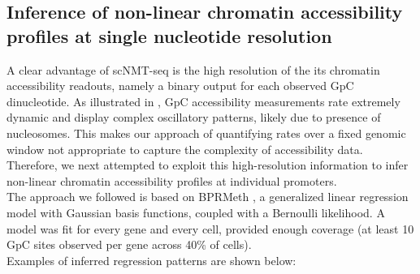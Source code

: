 
\subsection{Inference of non-linear chromatin accessibility profiles at single nucleotide resolution}

A clear advantage of scNMT-seq is the high resolution of the its chromatin accessibility readouts, namely a binary output for each observed GpC dinucleotide. As illustrated in , GpC accessibility measurements rate extremely dynamic and display complex oscillatory patterns, likely due to presence of nucleosomes. This makes our approach of quantifying rates over a fixed genomic window not appropriate to capture the complexity of accessibility data. Therefore, we next attempted to exploit this high-resolution information to infer non-linear chromatin accessibility profiles at individual promoters.\\
The approach we followed is based on BPRMeth \cite{Kapourani2018}, a generalized linear regression model with Gaussian basis functions, coupled with a Bernoulli likelihood. A model was fit for every gene and every cell, provided enough coverage (at least 10 GpC sites observed per gene across 40\% of cells).\\
 Examples of inferred regression patterns are shown below:

